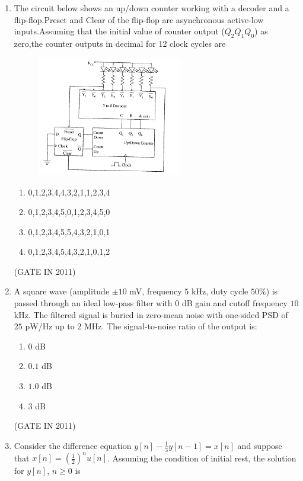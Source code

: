 \documentclass[journal]{IEEEtran}
\begin{document}
\begin{enumerate}
\item The circuit below shows an up/down counter working with a decoder and a flip-flop.Preset and Clear of the flip-flop are asynchronous active-low inputs.Assuming that the initial value of counter output ($Q_2 Q_1 Q_0$) as zero,the counter outputs in decimal for 12 clock cycles are
\begin{figure}[H]
    \centering
      \includegraphics[width=0.6\textwidth]{16.png} 
      \caption{}
    \label{fig:fig16} 
\end{figure}
\begin{enumerate}
\item 0,1,2,3,4,4,3,2,1,1,2,3,4
\item 0,1,2,3,4,5,0,1,2,3,4,5,0
\item 0,1,2,3,4,5,5,4,3,2,1,0,1
\item 0,1,2,3,4,5,4,3,2,1,0,1,2
\end{enumerate}
 \hfill(GATE IN 2011)

\item A square wave (amplitude $\pm 10$ mV, frequency $5$ kHz, duty cycle $50\%$) is passed through an ideal low-pass filter with $0$ dB gain and cutoff frequency $10$ kHz. The filtered signal is buried in zero-mean noise with one-sided PSD of $25$ pW/Hz up to $2$ MHz. The signal-to-noise ratio of the output is:
\begin{multicols}{4}
\begin{enumerate}
\item $0$ dB  
\item $0.1$ dB  
\item $1.0$ dB  
\item $3$ dB
\end{enumerate}
\end{multicols} \hfill(GATE IN 2011)

\item Consider the difference equation $y[n] - \frac{1}{3} y[n-1] = x[n]$ and suppose that $x[n] = \left( \frac{1}{2} \right)^n u[n]$. Assuming the condition of initial rest, the solution for $y[n]$, $n \geq 0$ is


\end{enumerate}
\end{document}
